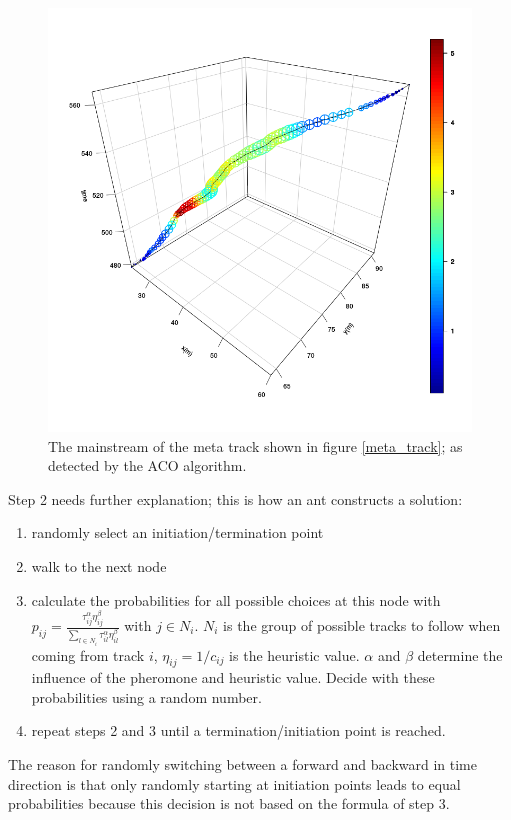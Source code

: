 \documentclass{scrartcl}
\begin{document}
\begin{figure}[h]
	\centering
	\includegraphics[width=.8\linewidth]{scatter3D_meta_mainstream_2}
	\caption{The mainstream of the meta track shown in figure \ref{meta_track}; as detected by the ACO algorithm.}
	\label{meta_track_mainstr}
\end{figure}

Step 2 needs further explanation; this is how an ant constructs a solution: 
\begin{enumerate}
	\item randomly select an initiation/termination point
	\item walk to the next node
    \item calculate the probabilities for all possible choices at this node with $p_{ij}=\frac{\tau_{ij}^\alpha \eta_{ij}^\beta}{\sum_{l\in N_i} {\tau_{il}^\alpha \eta_{il}^\beta}}$ with $j \in N_i$. $N_i$ is the group of possible tracks to follow when coming from track $i$, $\eta_{ij}=1/c_{ij}$ is the heuristic value. $\alpha$ and $\beta$ determine the influence of the pheromone and heuristic value. Decide with these probabilities using a random number.
    \item repeat steps 2 and 3 until a termination/initiation point is reached.
\end{enumerate}
The reason for randomly switching between a forward and backward in time direction is that only randomly starting at initiation points leads to equal probabilities  because this decision is not based on the formula of step 3.
\end{document}
